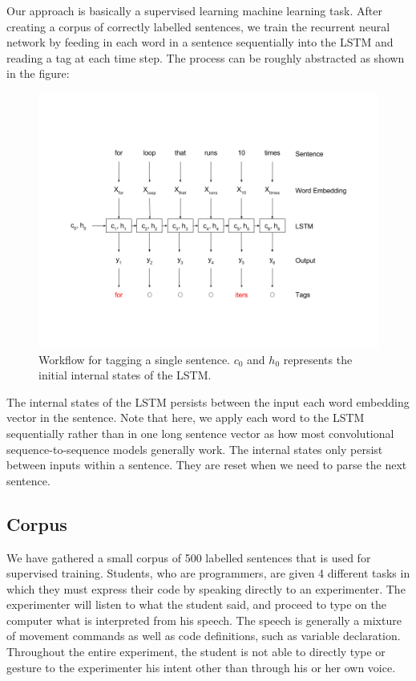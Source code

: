 \documentclass[fyp]{socreport}
\begin{document}
Our approach is basically a supervised learning machine learning task. After
creating a corpus of correctly labelled sentences, we train the recurrent
neural network by feeding in each word in a sentence sequentially into the LSTM
and reading a tag at each time step. The process can be roughly abstracted as
shown in the figure:

\begin{figure}[h]
\includegraphics[width=\textwidth]{Workflow.png}
\caption{Workflow for tagging a single sentence.
$c_0$ and $h_0$ represents the initial internal states of the LSTM.}
\centering
\end{figure}

The internal states of the LSTM persists between the input each word
embedding vector in the sentence. Note that here, we apply each word
to the LSTM sequentially rather than in one long sentence vector as
how most convolutional sequence-to-sequence models generally work. The
internal states only persist between inputs within a sentence. They are
reset when we need to parse the next sentence.

\subsection{Corpus}
We have gathered a small corpus of 500 labelled sentences that is used for
supervised training. Students, who are programmers, are given 4 different tasks
in which they must express their code by speaking directly to an experimenter.
The experimenter will listen to what the student said, and proceed to type on
the computer what is interpreted from his speech. The speech is generally a mixture
of movement commands as well as code definitions, such as variable declaration.
Throughout the entire experiment, the student is not able to directly type or
gesture to the experimenter his intent other than through his or her own voice.
\end{document}
